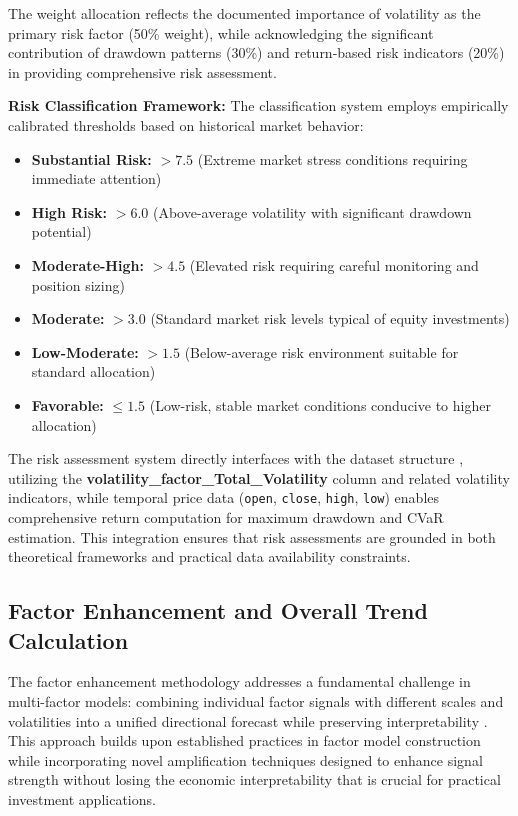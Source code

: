 \documentclass[3p,times,procedia]{elsarticle}
\begin{document}
The weight allocation reflects the documented importance of volatility as the primary risk factor (50\% weight), while acknowledging the significant contribution of drawdown patterns (30\%) and return-based risk indicators (20\%) in providing comprehensive risk assessment.

\textbf{Risk Classification Framework:}
The classification system employs empirically calibrated thresholds based on historical market behavior:
\begin{itemize}
    \item \textbf{Substantial Risk:} $> 7.5$ (Extreme market stress conditions requiring immediate attention)
    \item \textbf{High Risk:} $> 6.0$ (Above-average volatility with significant drawdown potential)
    \item \textbf{Moderate-High:} $> 4.5$ (Elevated risk requiring careful monitoring and position sizing)
    \item \textbf{Moderate:} $> 3.0$ (Standard market risk levels typical of equity investments)
    \item \textbf{Low-Moderate:} $> 1.5$ (Below-average risk environment suitable for standard allocation)
    \item \textbf{Favorable:} $\leq 1.5$ (Low-risk, stable market conditions conducive to higher allocation)
\end{itemize} 

The risk assessment system directly interfaces with the dataset structure \cite{FinReportDataset2025}, utilizing the \textbf{volatility\_factor\_Total\_Volatility} column and related volatility indicators, while temporal price data (\texttt{open}, \texttt{close}, \texttt{high}, \texttt{low}) enables comprehensive return computation for maximum drawdown and CVaR estimation. This integration ensures that risk assessments are grounded in both theoretical frameworks and practical data availability constraints.

\subsection{{Factor Enhancement and Overall Trend Calculation}}

The factor enhancement methodology addresses a fundamental challenge in multi-factor models: combining individual factor signals with different scales and volatilities into a unified directional forecast while preserving interpretability \cite{Harvey2016,Carhart1997}. This approach builds upon established practices in factor model construction while incorporating novel amplification techniques designed to enhance signal strength without losing the economic interpretability that is crucial for practical investment applications.
\end{document}
